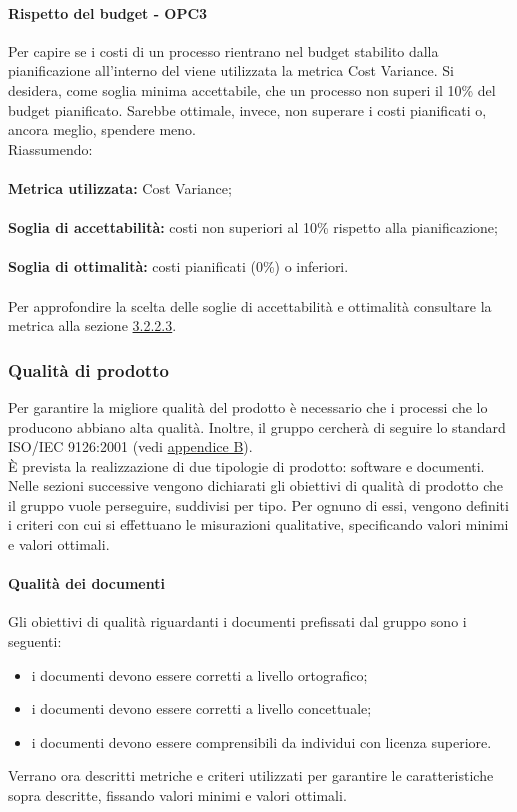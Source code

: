 \documentclass[PianoDiQualifica.tex]{subfiles}
\begin{document}
			\paragraph{Rispetto del budget - OPC3}
			Per capire se i costi di un processo rientrano nel budget stabilito dalla pianificazione all'interno del \PPdocRR{} viene utilizzata la metrica Cost Variance.
			Si desidera, come soglia minima accettabile, che un processo non superi il 10\% del budget pianificato. Sarebbe ottimale, invece, non superare i costi pianificati o, ancora meglio,
			spendere meno.\\
			Riassumendo: \\ \\
			\textbf{Metrica utilizzata:} Cost Variance; \\ \\
			\textbf{Soglia di accettabilità:} costi non superiori al 10\% rispetto alla pianificazione; \\ \\
			\textbf{Soglia di ottimalità:}  costi pianificati (0\%) o inferiori. \\ \\
			Per approfondire la scelta delle soglie di accettabilità e ottimalità consultare la metrica alla sezione \hyperlink{Cost_m}{3.2.2.3}.
			
		\subsubsection{Qualità di prodotto}
		Per garantire la migliore qualità del prodotto è necessario che i processi che lo producono abbiano alta qualità.
		Inoltre, il gruppo \GRUPPO{} cercherà di seguire lo standard ISO/IEC 9126:2001 (vedi \hyperlink{ISOIEC}{appendice B}). \\
		È prevista la realizzazione di due tipologie di prodotto: software e documenti.
		Nelle sezioni successive vengono dichiarati gli obiettivi di qualità di prodotto che il gruppo vuole perseguire, suddivisi per tipo.
		Per ognuno di essi, vengono definiti i criteri con cui si effettuano le misurazioni qualitative, specificando valori minimi e valori ottimali.
		
			\paragraph{Qualità dei documenti}
			Gli obiettivi di qualità riguardanti i documenti prefissati dal gruppo \GRUPPO{} sono i seguenti:
			\begin{itemize}
				\item i documenti devono essere corretti a livello ortografico;
				\item i documenti devono essere corretti a livello concettuale;
				\item i documenti devono essere comprensibili da individui con licenza superiore.
			\end{itemize}
			Verrano ora descritti metriche e criteri utilizzati per garantire le caratteristiche sopra descritte, fissando valori minimi e valori ottimali.
			
\end{document}
